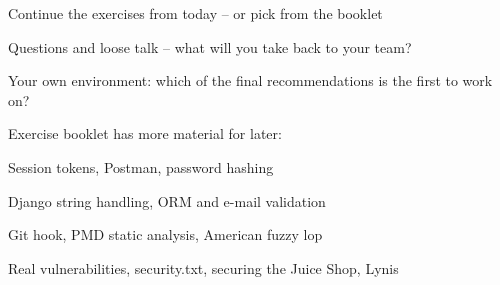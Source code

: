 \documentclass[Screen16to9,17pt]{foils}
\begin{document}
\begin{list2}
\item Continue the exercises from today -- or pick from the booklet
\item Questions and loose talk -- what will you take back to your team?
\item Your own environment: which of the final recommendations is the first to work on?
\item Exercise booklet has more material for later:
\begin{list2}
\item Session tokens, Postman, password hashing
\item Django string handling, ORM and e-mail validation
\item Git hook, PMD static analysis, American fuzzy lop
\item Real vulnerabilities, security.txt, securing the Juice Shop, Lynis
\end{list2}
\end{list2}
\end{document}
